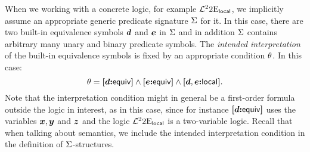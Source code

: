 When we working with a concrete logic, for example
$\mathcal{L}^{2}_{{}}{2}\mathrm{E}_{\mathsf{local}}$,
we implicitly assume an appropriate generic predicate signature $\mathrm{\Sigma}$ for it.
In this case, there are two built-in equivalence symbols $\bm{d}$ and $\bm{e}$ in
$\mathrm{\Sigma}$ and in addition $\mathrm{\Sigma}$ contains arbitrary many unary
and binary predicate symbols.
The \emph{intended interpretation} of the built-in equivalence symbols is fixed
by an appropriate condition $\theta$.
In this case:
\[
  \theta = {\bm{[}\bm{d}\mathord{\bm{:}}\mathsf{equiv}\bm{]}} \land {\bm{[}\bm{e}\mathord{\bm{:}}\mathsf{equiv}\bm{]}} \land {\bm{[}\bm{d},\bm{e}\mathord{\bm{:}}\mathsf{local}\bm{]}}.
\] 
Note that the interpretation condition might in general be a first-order formula
outside the logic in interest, as in this case, since for instance ${\bm{[}\bm{d}\mathord{\bm{:}}\mathsf{equiv}\bm{]}}$
uses the variables $\bm{x},\bm{y}$ and $\bm{z}$ and the logic
$\mathcal{L}^{2}_{{}}{2}\mathrm{E}_{\mathsf{local}}$ is a two-variable logic.
Recall that when talking about semantics, we include the intended interpretation
condition in the definition of $\mathrm{\Sigma}$-structures.
